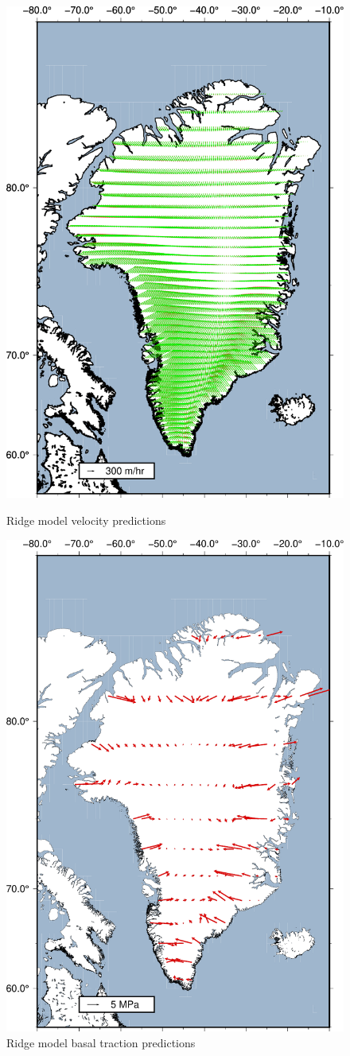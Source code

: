 \documentclass{article}
\begin{document}
\begin{figure}[!htb]
   \begin{minipage}{0.45\textwidth}
     \centering
     \includegraphics[width=.7\linewidth]{Ridge_pred_REAL.pdf}
     \caption{Ridge model velocity predictions}\label{Fig:Data4}
   \end{minipage}\hfill
   \begin{minipage}{0.45\textwidth}
     \centering
     \includegraphics[width=.7\linewidth]{figures/greenland_traction_Ridge_0.15199.pdf}
     \caption{Ridge model basal traction predictions}\label{Fig:Data5}
   \end{minipage}
\end{figure}
\end{document}
